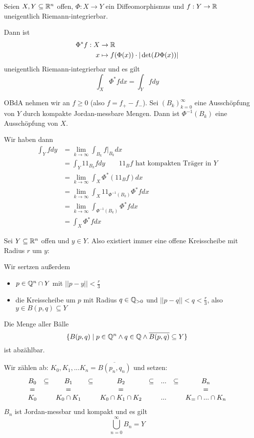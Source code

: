 \documentclass[main.tex]{subfiles}
\begin{document}
\begin{Theorem}[Substitutionsregel]
  Seien $X,Y \subseteq \mathbb{R}^n$ offen, $\Phi: X \to Y$ ein Diffeomorphismus und $f: Y \to \mathbb{R}$ uneigentlich Riemann-integrierbar.

  Dann ist
  $$\begin{aligned}
    \Phi^* f : X & \to \mathbb{R} \\
    x & \mapsto f(\Phi(x)) \cdot |\det(D\Phi(x))|
  \end{aligned}$$
  uneigentlich Riemann-integrierbar und es gilt
  $$\int_X \Phi^* f dx = \int_Y f dy$$
\end{Theorem}

\begin{Beweis}
  OBdA nehmen wir an $f \geq 0$ (also $f = f_+ - f_-$). Sei $(B_k)_{k=0}^\infty$ eine Ausschöpfung von $Y$ durch kompakte Jordan-messbare Mengen. Dann ist $\Phi^{-1}(B_k)$ eine Ausschöpfung von $X$.

  Wir haben dann
  $$\begin{aligned}
    \int_Y f dy & = \lim \limits_{k \to \infty} \int_{B_k} f|_{B_k} dx \\
    & = \int_Y 1\!\!1_{B_k} f dy \qquad 1\!\!1_B f  \text{ hat kompakten Träger in }Y\\
    & = \lim \limits_{k \to \infty} \int_X \Phi^* ( 1\!\!1_B f)dx \\
    & = \lim \limits_{k \to \infty} \int_X 1\!\!1_{\Phi^{-1}(B_k)} \Phi^* f dx \\
    & = \lim \limits_{k \to \infty} \int_{\Phi^{-1}(B_k)} \Phi^* f dx \\
    & = \int_X \Phi^* f dx
  \end{aligned}$$
\end{Beweis}

\begin{Beispiel}
  Sei $Y \subseteq \mathbb{R}^n$ offen und $y \in Y$. Also existiert immer eine offene Kreisscheibe mit Radius $r$ um $y$:

  Wir sertzen außerdem
  \begin{itemize}
    \item $p \in \mathbb{Q}^n \cap Y$ mit $||p-y|| < \frac{r}{3}$
    \item die Kreisscheibe um $p$ mit Radius $q \in \mathbb{Q}_{> 0}$ und $||p-q|| < q < \frac{r}{3}$, also $y \in B(p,q) \subseteq Y$
  \end{itemize}
  Die Menge aller Bälle
  $$\{B(p,q) \mid p \in \mathbb{Q}^n \land q \in \mathbb{Q} \land \overline{B(p,q)} \subseteq Y\}$$
  ist abzählbar.

  Wir zählen ab: $K_0,K_1,...K_n = \overline{B(p_n,q_n)}$ und setzen:
  $$\begin{array}{c c c c c c c c c}
    B_0 & \subseteq & B_1 & \subseteq & B_2 & \subseteq & ... & \subseteq & B_n \\
    = & & = & & = & & & & = \\
    K_0 & & K_0 \cap K_1 & & K_0 \cap K_1 \cap K_2 & & ... & & K_= \cap ... \cap K_n
  \end{array}$$
  $B_n$ ist Jordan-messbar und kompakt und es gilt
  $$\bigcup_{n=0}^\infty B_n = Y$$
\end{Beispiel}
\end{document}
